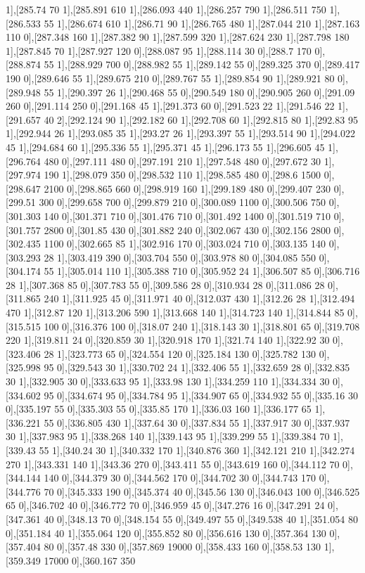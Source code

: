 {1],[285.74 70 1],[285.891 610 1],[286.093 440 1],[286.257 790 1],[286.511 750 1],[286.533 55 1],[286.674 610 1],[286.71 90 1],[286.765 480 1],[287.044 210 1],[287.163 110 0],[287.348 160 1],[287.382 90 1],[287.599 320 1],[287.624 230 1],[287.798 180 1],[287.845 70 1],[287.927 120 0],[288.087 95 1],[288.114 30 0],[288.7 170 0],[288.874 55 1],[288.929 700 0],[288.982 55 1],[289.142 55 0],[289.325 370 0],[289.417 190 0],[289.646 55 1],[289.675 210 0],[289.767 55 1],[289.854 90 1],[289.921 80 0],[289.948 55 1],[290.397 26 1],[290.468 55 0],[290.549 180 0],[290.905 260 0],[291.09 260 0],[291.114 250 0],[291.168 45 1],[291.373 60 0],[291.523 22 1],[291.546 22 1],[291.657 40 2],[292.124 90 1],[292.182 60 1],[292.708 60 1],[292.815 80 1],[292.83 95 1],[292.944 26 1],[293.085 35 1],[293.27 26 1],[293.397 55 1],[293.514 90 1],[294.022 45 1],[294.684 60 1],[295.336 55 1],[295.371 45 1],[296.173 55 1],[296.605 45 1],[296.764 480 0],[297.111 480 0],[297.191 210 1],[297.548 480 0],[297.672 30 1],[297.974 190 1],[298.079 350 0],[298.532 110 1],[298.585 480 0],[298.6 1500 0],[298.647 2100 0],[298.865 660 0],[298.919 160 1],[299.189 480 0],[299.407 230 0],[299.51 300 0],[299.658 700 0],[299.879 210 0],[300.089 1100 0],[300.506 750 0],[301.303 140 0],[301.371 710 0],[301.476 710 0],[301.492 1400 0],[301.519 710 0],[301.757 2800 0],[301.85 430 0],[301.882 240 0],[302.067 430 0],[302.156 2800 0],[302.435 1100 0],[302.665 85 1],[302.916 170 0],[303.024 710 0],[303.135 140 0],[303.293 28 1],[303.419 390 0],[303.704 550 0],[303.978 80 0],[304.085 550 0],[304.174 55 1],[305.014 110 1],[305.388 710 0],[305.952 24 1],[306.507 85 0],[306.716 28 1],[307.368 85 0],[307.783 55 0],[309.586 28 0],[310.934 28 0],[311.086 28 0],[311.865 240 1],[311.925 45 0],[311.971 40 0],[312.037 430 1],[312.26 28 1],[312.494 470 1],[312.87 120 1],[313.206 590 1],[313.668 140 1],[314.723 140 1],[314.844 85 0],[315.515 100 0],[316.376 100 0],[318.07 240 1],[318.143 30 1],[318.801 65 0],[319.708 220 1],[319.811 24 0],[320.859 30 1],[320.918 170 1],[321.74 140 1],[322.92 30 0],[323.406 28 1],[323.773 65 0],[324.554 120 0],[325.184 130 0],[325.782 130 0],[325.998 95 0],[329.543 30 1],[330.702 24 1],[332.406 55 1],[332.659 28 0],[332.835 30 1],[332.905 30 0],[333.633 95 1],[333.98 130 1],[334.259 110 1],[334.334 30 0],[334.602 95 0],[334.674 95 0],[334.784 95 1],[334.907 65 0],[334.932 55 0],[335.16 30 0],[335.197 55 0],[335.303 55 0],[335.85 170 1],[336.03 160 1],[336.177 65 1],[336.221 55 0],[336.805 430 1],[337.64 30 0],[337.834 55 1],[337.917 30 0],[337.937 30 1],[337.983 95 1],[338.268 140 1],[339.143 95 1],[339.299 55 1],[339.384 70 1],[339.43 55 1],[340.24 30 1],[340.332 170 1],[340.876 360 1],[342.121 210 1],[342.274 270 1],[343.331 140 1],[343.36 270 0],[343.411 55 0],[343.619 160 0],[344.112 70 0],[344.144 140 0],[344.379 30 0],[344.562 170 0],[344.702 30 0],[344.743 170 0],[344.776 70 0],[345.333 190 0],[345.374 40 0],[345.56 130 0],[346.043 100 0],[346.525 65 0],[346.702 40 0],[346.772 70 0],[346.959 45 0],[347.276 16 0],[347.291 24 0],[347.361 40 0],[348.13 70 0],[348.154 55 0],[349.497 55 0],[349.538 40 1],[351.054 80 0],[351.184 40 1],[355.064 120 0],[355.852 80 0],[356.616 130 0],[357.364 130 0],[357.404 80 0],[357.48 330 0],[357.869 19000 0],[358.433 160 0],[358.53 130 1],[359.349 17000 0],[360.167 350 }
